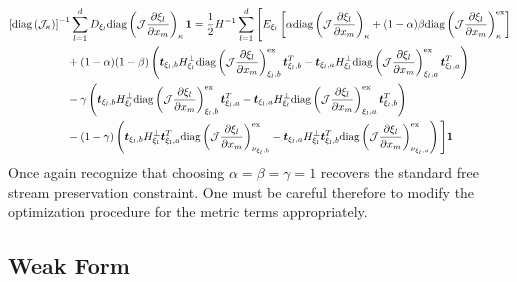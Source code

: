 \documentclass[12pt,a4paper]{article}
\newcommand{\pder}[2][]{\dfrac{\partial #1}{\partial #2}} %
\newcommand{\fn}[1]{\mathcal{#1}} %
\begin{document}
\begin{align*}
 \left[ \text{diag}\left( \fn{J}_\kappa \right) \right]^{-1} \sum_{l=1}^d  D_{\xi_l} \text{diag} \left( \fn{J} \pder[\xi_l]{x_m} \right)_\kappa \bm{1} &= \frac{1}{2} H^{-1}  \sum_{l=1}^d \Bigg[ E_{\xi_l} \left[ \alpha \text{diag}  \left( \fn{J} \pder[\xi_l]{x_m} \right)_{\kappa} + (1-\alpha) \beta \text{diag}  \left( \fn{J} \pder[\xi_l]{x_m} \right)_{\kappa}^\text{ex} \right]  \\
& \hspace{-4cm} + (1-\alpha) (1- \beta) \left(  \bm{t}_{\xi_l, b} H^{\bot}_{\xi_l}  \text{diag} \left( \fn{J} \pder[\xi_l]{x_m} \right)_{\xi_l, b}^\text{ex} \bm{t}_{\xi_l, b}^T -  \bm{t}_{\xi_l, a} H^{\bot}_{\xi_l}  \text{diag} \left( \fn{J} \pder[\xi_l]{x_m} \right)_{\xi_l , a}^\text{ex} \bm{t}_{\xi_l, a}^T \right)  \\ 
& \hspace{-4cm} - \gamma \left( \bm{t}_{\xi_l, b} H^{\bot}_{\xi_l}  \text{diag} \left( \fn{J} \pder[\xi_l]{x_m} \right)_{\xi_l,b}^\text{ex} \bm{t}_{\xi_l, a}^T  - \bm{t}_{\xi_l, a} H^{\bot}_{\xi_l} \text{diag} \left( \fn{J} \pder[\xi_l]{x_m} \right)_{\xi_l,a}^\text{ex} \bm{t}_{\xi_l, b}^T  \right) \\
& \hspace{-4cm} - (1-\gamma) \left(  \bm{t}_{\xi_l, b} H^{\bot}_{\xi_l} \bm{t}_{\xi_l, a}^T \text{diag} \left( \fn{J} \pder[\xi_l]{x_m} \right)_{\nu_{\xi_l,b}}^\text{ex} -  \bm{t}_{\xi_l, a} H^{\bot}_{\xi_l} \bm{t}_{\xi_l, b}^T \text{diag} \left( \fn{J} \pder[\xi_l]{x_m} \right)_{\nu_{\xi_l,a}}^\text{ex} \right)  \Bigg] \bm{1}
\end{align*}
Once again recognize that choosing $\alpha = \beta = \gamma = 1$ recovers the standard free stream preservation constraint. One must be careful therefore to modify the optimization procedure for the metric terms appropriately.




\subsection{Weak Form}
\end{document}
